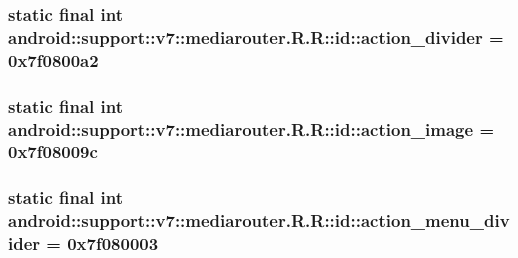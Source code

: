 \hypertarget{classandroid_1_1support_1_1v7_1_1mediarouter_1_1_r_1_1id_47cd765743dc4b8b254b2c22441d9dcc}{
\subsubsection[{action\_\-divider}]{\setlength{\rightskip}{0pt plus 5cm}static final int android::support::v7::mediarouter.R.R::id::action\_\-divider = 0x7f0800a2}}
\label{classandroid_1_1support_1_1v7_1_1mediarouter_1_1_r_1_1id_47cd765743dc4b8b254b2c22441d9dcc}


\hypertarget{classandroid_1_1support_1_1v7_1_1mediarouter_1_1_r_1_1id_9d5ff4169a413ede7300b72dd3b5326e}{
\subsubsection[{action\_\-image}]{\setlength{\rightskip}{0pt plus 5cm}static final int android::support::v7::mediarouter.R.R::id::action\_\-image = 0x7f08009c}}
\label{classandroid_1_1support_1_1v7_1_1mediarouter_1_1_r_1_1id_9d5ff4169a413ede7300b72dd3b5326e}


\hypertarget{classandroid_1_1support_1_1v7_1_1mediarouter_1_1_r_1_1id_f849daf24ecd722a027b4c262dff7474}{
\subsubsection[{action\_\-menu\_\-divider}]{\setlength{\rightskip}{0pt plus 5cm}static final int android::support::v7::mediarouter.R.R::id::action\_\-menu\_\-divider = 0x7f080003}}
\label{classandroid_1_1support_1_1v7_1_1mediarouter_1_1_r_1_1id_f849daf24ecd722a027b4c262dff7474}


